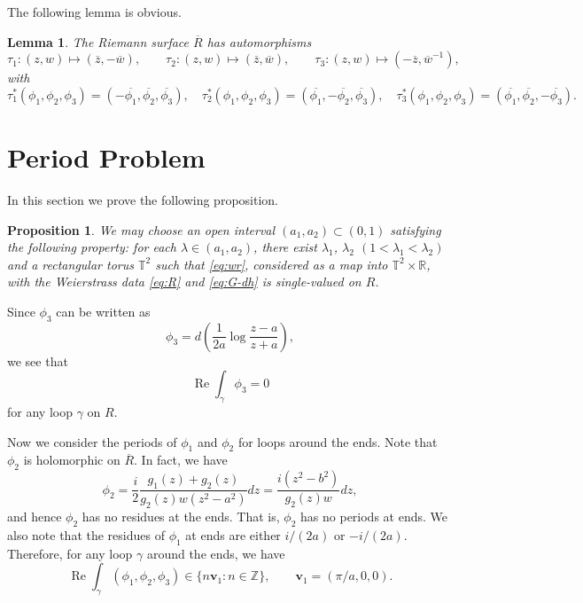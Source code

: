 \documentclass[11pt]{amsart}
\renewcommand{\Re}{\operatorname{Re}}
\numberwithin{equation}{section}
\numberwithin{figure}{section}
\theoremstyle{plain} %
\newtheorem{lemma}[theorem]{Lemma}
\newtheorem{proposition}[theorem]{Proposition}
\theoremstyle{definition} %
\begin{document}

The following lemma is obvious. 

\begin{lemma}\label{lm:sym}
The Riemann surface $\overline{R}$ has automorphisms 
\[
\tau_1:(z,w)\mapsto(\overline{z},-\overline{w}),\qquad
\tau_2:(z,w)\mapsto(\overline{z},\overline{w}),\qquad
\tau_3:(z,w)\mapsto(-\overline{z},\overline{w}^{-1}),
\]
with 
\[
\tau_1^*(\phi_1,\phi_2,\phi_3)=(-\overline{\phi_1},\overline{\phi_2},\overline{\phi_3}),\quad
\tau_2^*(\phi_1,\phi_2,\phi_3)=(\overline{\phi_1},-\overline{\phi_2},\overline{\phi_3}),\quad
\tau_3^*(\phi_1,\phi_2,\phi_3)=(\overline{\phi_1},\overline{\phi_2},-\overline{\phi_3}).
\]
\end{lemma}

\section{Period Problem}
\label{period}

In this section we prove the following proposition.

\begin{proposition}\label{pr:existence}
We may choose an open interval $(a_1,a_2)\subset (0,1)$ satisfying the following 
property{\rm :}
for each $\lambda\in (a_1,a_2)$, 
there exist $\lambda_1$, $\lambda_2$ $(1<\lambda_1<\lambda_2)$ and a rectangular torus $\mathbb{T}^2$ such that \eqref{eq:wr}, considered as a map into $\mathbb{T}^2\times\mathbb{R}$,  with the Weierstrass data \eqref{eq:R} and \eqref{eq:G-dh} is single-valued on $R$. 
\end{proposition}

Since $\phi_3$ can be written as
\[
\phi_3=d\left(\frac{1}{2a}\log\frac{z-a}{z+a}\right), 
\]
we see that 
\[
\Re\int_\gamma\phi_3 = 0
\]
for any loop $\gamma$ on $R$. 
 
Now we consider the periods of $\phi_1$ and $\phi_2$ for loops around the ends. 
Note that $\phi_2$ is holomorphic on $\overline{R}$.  In fact, we have
\[
\phi_2=\frac{i}{2}\frac{g_1(z)+g_2(z)}{g_2(z)w(z^2-a^2)}dz=\frac{i(z^2-b^2)}{g_2(z)w}dz, 
\]
and hence $\phi_2$ has no residues at the ends.  That is, 
$\phi_2$ has no periods at ends. 
We also note that the residues of $\phi_1$ at ends are either $i/(2a)$ or $-i/(2a)$. 
Therefore, for any loop $\gamma$ around the ends, we have
\[
\Re\int_{\gamma}(\phi_1,\phi_2,\phi_3)\in \{n\bm{v}_1:n\in\mathbb{Z}\},
\qquad
\bm{v}_1=(\pi/a,0,0).
\]
\end{document}
